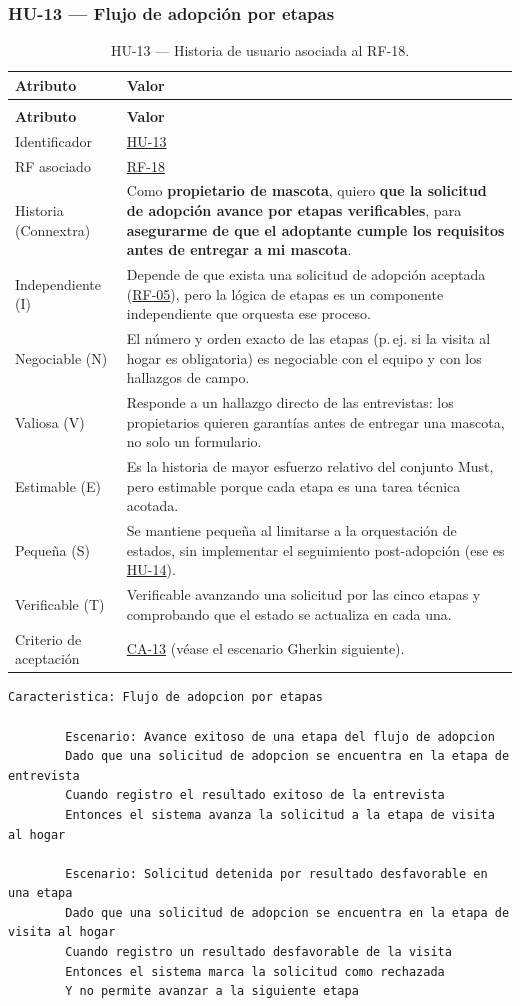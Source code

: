 \documentclass[journal,onecolumn]{IEEEtran}
\makeatletter
\newenvironment{atributos}[2]{%
	\small
	\begin{longtable}{@{}>{\raggedright\arraybackslash}p{4.2cm} >{\raggedright\arraybackslash}p{11.2cm}@{}}
		\caption{#2}\label{tab:#1}\\
		\toprule
		\textbf{Atributo} & \textbf{Valor} \\
		\midrule
		\endfirsthead
		\multicolumn{2}{@{}l}{\small\itshape (continuación)}\\
		\toprule
		\textbf{Atributo} & \textbf{Valor} \\
		\midrule
		\endhead
		\bottomrule
		\endlastfoot
	}{%
	\end{longtable}
	\normalsize
}
\makeatother
\begin{document}
	\subsubsection{HU-13 --- Flujo de adopción por etapas}
	
	\begin{atributos}{HU-13}{HU-13 --- Historia de usuario asociada al RF-18.}
		Identificador & \hyperref[tab:HU-13]{HU-13} \\
		RF asociado & \hyperref[tab:RF-18]{RF-18} \\
		Historia (Connextra) & Como \textbf{propietario de mascota}, quiero \textbf{que la solicitud de adopción avance por etapas verificables}, para \textbf{asegurarme de que el adoptante cumple los requisitos antes de entregar a mi mascota}. \\
		Independiente (I) & Depende de que exista una solicitud de adopción aceptada (\hyperref[tab:RF-05]{RF-05}), pero la lógica de etapas es un componente independiente que orquesta ese proceso. \\
		Negociable (N) & El número y orden exacto de las etapas (p.\,ej. si la visita al hogar es obligatoria) es negociable con el equipo y con los hallazgos de campo. \\
		Valiosa (V) & Responde a un hallazgo directo de las entrevistas: los propietarios quieren garantías antes de entregar una mascota, no solo un formulario. \\
		Estimable (E) & Es la historia de mayor esfuerzo relativo del conjunto Must, pero estimable porque cada etapa es una tarea técnica acotada. \\
		Pequeña (S) & Se mantiene pequeña al limitarse a la orquestación de estados, sin implementar el seguimiento post-adopción (ese es \hyperref[tab:HU-14]{HU-14}). \\
		Verificable (T) & Verificable avanzando una solicitud por las cinco etapas y comprobando que el estado se actualiza en cada una. \\
		Criterio de aceptación & \hyperref[lst:ca13]{CA-13} (véase el escenario Gherkin siguiente). \\
	\end{atributos}
	
	\begin{lstlisting}[style=gherkin,caption={CA-13 --- Escenario de aceptación de la historia HU-13.},label={lst:ca13}]
		Caracteristica: Flujo de adopcion por etapas
		
		Escenario: Avance exitoso de una etapa del flujo de adopcion
		Dado que una solicitud de adopcion se encuentra en la etapa de entrevista
		Cuando registro el resultado exitoso de la entrevista
		Entonces el sistema avanza la solicitud a la etapa de visita al hogar
		
		Escenario: Solicitud detenida por resultado desfavorable en una etapa
		Dado que una solicitud de adopcion se encuentra en la etapa de visita al hogar
		Cuando registro un resultado desfavorable de la visita
		Entonces el sistema marca la solicitud como rechazada
		Y no permite avanzar a la siguiente etapa
	\end{lstlisting}
	
\end{document}

